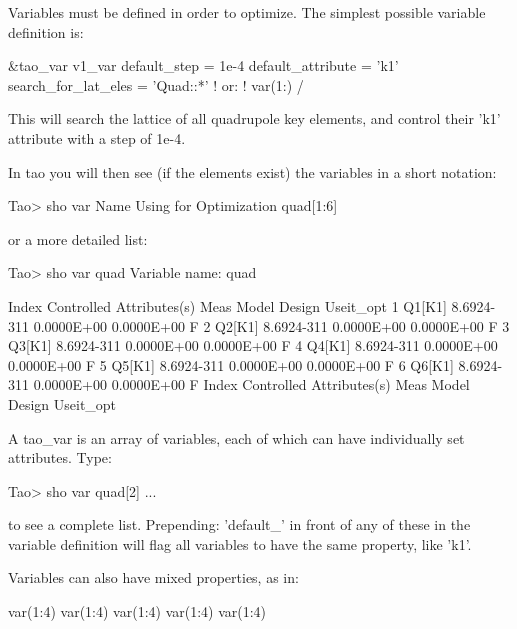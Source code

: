 \documentclass{hitec}
\begin{document}
Variables must be defined in order to optimize. The simplest possible variable definition is: 
\begin{code}
    &tao_var
      v1_var%
      default_step = 1e-4
      default_attribute = 'k1'
      search_for_lat_eles = 'Quad::*'
      ! or: 
      ! var(1:)%
    /
\end{code}

This will search the lattice of all quadrupole key elements, and control their 'k1' attribute with a step of 1e-4.

In tao you will then see (if the elements exist) the variables in a short notation:
\begin{code}
Tao> sho var
       Name                                      Using for Optimization
    quad[1:6]
\end{code}

or a more detailed list:
\begin{code}
Tao> sho var quad
Variable name:  quad

 Index  Controlled Attributes(s)    Meas         Model        Design  Useit_opt
     1  Q1[K1]                  8.6924-311    0.0000E+00    0.0000E+00       F
     2  Q2[K1]                  8.6924-311    0.0000E+00    0.0000E+00       F
     3  Q3[K1]                  8.6924-311    0.0000E+00    0.0000E+00       F
     4  Q4[K1]                  8.6924-311    0.0000E+00    0.0000E+00       F
     5  Q5[K1]                  8.6924-311    0.0000E+00    0.0000E+00       F
     6  Q6[K1]                  8.6924-311    0.0000E+00    0.0000E+00       F
 Index  Controlled Attributes(s)    Meas         Model        Design  Useit_opt
\end{code}

A tao_var is an array of variables, each of which can have individually set attributes. Type: 
\begin{code}
Tao> sho var quad[2]
...
\end{code}

to see a complete list. Prepending: 'default_' in front of any of these in the variable definition will flag all variables to have the same property, like 'k1'. 

Variables can also have mixed properties, as in:
\begin{code}
var(1:4)%
var(1:4)%
var(1:4)%
var(1:4)%
var(1:4)%
\end{code}
\end{document}
